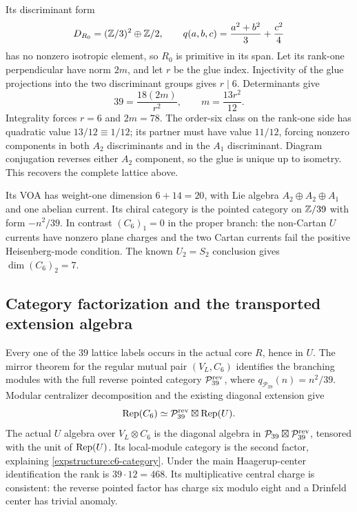 Its discriminant form
\[
 D_{R_0}=(\mathbb Z/3)^2\oplus\mathbb Z/2,
 \qquad q(a,b,c)=\frac{a^2+b^2}{3}+\frac{c^2}{4}
\]
has no nonzero isotropic element, so $R_0$ is primitive in its
span. Let its rank-one perpendicular have norm $2m$, and let
$r$ be the glue index. Injectivity of the glue projections into
the two discriminant groups gives $r\mid6$. Determinants give
\[
 39=\frac{18(2m)}{r^2},\qquad m=\frac{13r^2}{12}.
\]
Integrality forces $r=6$ and $2m=78$. The order-six class on the
rank-one side has quadratic value $13/12\equiv1/12$; its partner
must have value $11/12$, forcing nonzero components in both
$A_2$ discriminants and in the $A_1$ discriminant. Diagram
conjugation reverses either $A_2$ component, so the glue is unique
up to isometry. This recovers the complete lattice above.

Its VOA has weight-one dimension $6+14=20$, with Lie algebra
$A_2\oplus A_2\oplus A_1$ and one abelian current. Its chiral
category is the pointed category on $\mathbb Z/39$ with form
$-n^2/39$. In contrast $(C_6)_1=0$ in the proper branch: the
non-Cartan $U$ currents have nonzero plane charges and the two
Cartan currents fail the positive Heisenberg-mode condition.
The known $U_2=S_2$ conclusion gives $\dim(C_6)_2=7$.

\subsection{Category factorization and the transported extension algebra}

Every one of the $39$ lattice labels occurs in the actual core
$R$, hence in $U$. The mirror theorem for the regular mutual
pair $(V_L,C_6)$ identifies the branching modules with the full
reverse pointed category $\mathcal P_{39}^{\rm rev}$, where
$q_{\mathcal P_{39}}(n)=n^2/39$. Modular centralizer decomposition
and the existing diagonal extension give
\begin{equation}
 \operatorname{Rep}(C_6)\simeq\mathcal P_{39}^{\rm rev}\boxtimes\operatorname{Rep}(U).
 \label{expstructure:c6-category}
\end{equation}
The actual $U$ algebra over $V_L\otimes C_6$ is the diagonal
algebra in $\mathcal P_{39}\boxtimes\mathcal P_{39}^{\rm rev}$,
tensored with the unit of $\operatorname{Rep}(U)$. Its local-module category
is the second factor, explaining \eqref{expstructure:c6-category}.
Under the main Haagerup-center identification the rank is
$39\cdot12=468$. Its multiplicative central charge is consistent:
the reverse pointed factor has charge six modulo eight and a
Drinfeld center has trivial anomaly.

